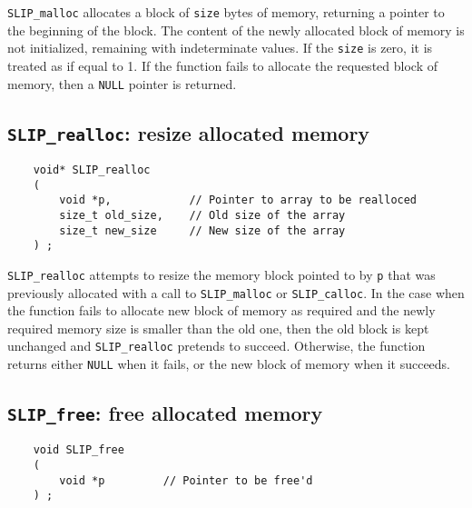 \documentclass[12pt]{article}
\theoremstyle{definition}
\begin{document}
\verb|SLIP_malloc| allocates a block of \verb|size| bytes of memory, returning
a pointer to the beginning of the block. The content of the newly allocated
block of memory is not initialized, remaining with indeterminate values.  If
the \verb|size| is zero, it is treated as if equal to 1.  If the function fails
to allocate the requested block of memory, then a \verb|NULL| pointer is
returned.

\cprotect\subsection{\verb|SLIP_realloc|: resize allocated memory}
\label{ss:SLIP_realloc}

\begin{mdframed}[userdefinedwidth=6in]
{\footnotesize
\begin{verbatim}
    void* SLIP_realloc
    (
        void *p,            // Pointer to array to be realloced
        size_t old_size,    // Old size of the array
        size_t new_size     // New size of the array
    ) ;
\end{verbatim}
} \end{mdframed}

\verb|SLIP_realloc| attempts to resize the memory block pointed to by \verb|p|
that was previously allocated with a call to \verb|SLIP_malloc| or
\verb|SLIP_calloc|. In the case when the function fails to allocate new block
of memory as required and the newly required memory size is smaller than the
old one, then the old block is kept unchanged and \verb|SLIP_realloc| pretends
to succeed. Otherwise, the function returns either \verb|NULL| when it fails,
or the new block of memory when it succeeds.

\cprotect\subsection{\verb|SLIP_free|: free allocated memory}
\label{ss:SLIP_free}

\begin{mdframed}[userdefinedwidth=6in]
{\footnotesize
\begin{verbatim}
    void SLIP_free
    (
        void *p         // Pointer to be free'd
    ) ;
\end{verbatim}
} \end{mdframed}
\end{document}
